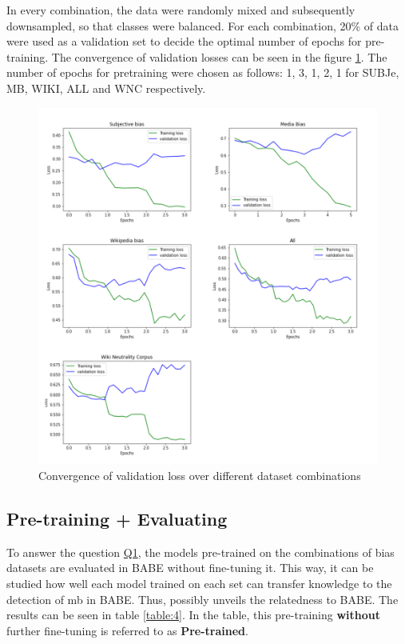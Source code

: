 In every combination, the data were randomly mixed and subsequently downsampled, so that classes were balanced. For each combination, 20\% of data were used as a validation set to decide the optimal number of epochs for pre-training. The convergence of validation losses can be seen in the figure \ref{fig:all_losses}. The number of epochs for pretraining were chosen as follows: 1, 3, 1, 2, 1 for SUBJe, MB, WIKI, ALL and WNC respectively.
\begin{figure}
  \includegraphics[scale=0.5]{my_modules/multimedia/all_losses.png}
  \caption{Convergence of validation loss over different dataset combinations}
  \label{fig:all_losses}
\end{figure}


\subsection{Pre-training + Evaluating}
To answer the question \hyperref[Q1]{Q1}, the models pre-trained on the combinations of bias datasets are evaluated in BABE without fine-tuning it. This way, it can be studied how well each model trained on each set can transfer knowledge to the detection of \gls{mb} in BABE. Thus, possibly unveils the relatedness to BABE. The results can be seen in table \ref{table:4}. In the table, this pre-training \textbf{without} further fine-tuning is referred to as \textbf{Pre-trained}.


